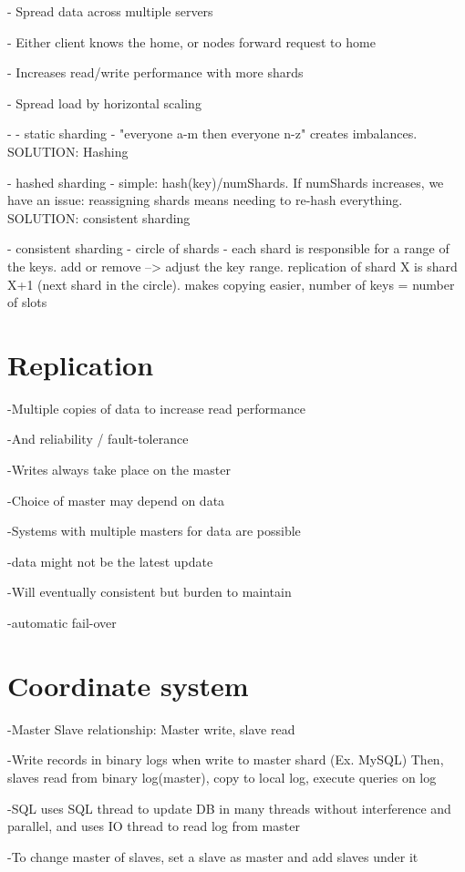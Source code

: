 \documentclass[fancy,11pt,titlestyle=display]{style/elegantbook}
\begin{document}
- Spread data across multiple servers

- Either client knows the home, or nodes forward request to home

- Increases read/write performance with more shards

- Spread load by horizontal scaling

- - static sharding - "everyone a-m then everyone n-z" creates imbalances. SOLUTION: Hashing

- hashed sharding - simple: hash(key)/numShards. If numShards increases, we have an issue: reassigning shards means needing to re-hash everything. SOLUTION: consistent sharding

- consistent sharding - circle of shards - each shard is responsible for a range of the keys. add or remove -->  adjust the key range. replication of shard X is shard X+1 (next shard in the circle). makes copying easier, number of keys = number of slots


\section{Replication}


-Multiple copies of data to increase read performance

-And reliability / fault-tolerance

-Writes always take place on the master

-Choice of master may depend on data

-Systems with multiple masters for data are possible

-data might not be the latest update

-Will eventually consistent but burden to maintain

-automatic fail-over


\section{Coordinate system}

-Master Slave relationship: Master write, slave read

-Write records in binary logs when write to master shard (Ex. MySQL) Then, slaves read from binary log(master), copy to local log, execute queries on log

-SQL uses SQL thread to update DB in many threads without interference and parallel, and uses IO thread to read log from master

-To change master of slaves, set a slave as master and add slaves under it
\end{document}
